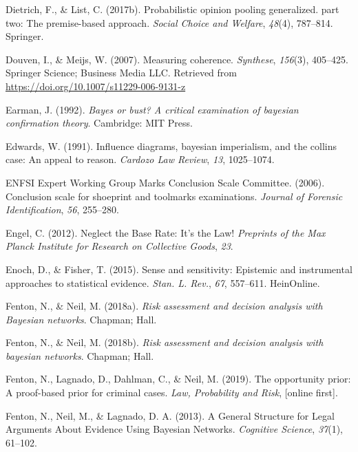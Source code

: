\documentclass[11pt,dvipsnames,enabledeprecatedfontcommands]{scrartcl}
\begin{document}
\hypertarget{ref-dietrich2017probabilistic2}{}
Dietrich, F., \& List, C. (2017b). Probabilistic opinion pooling
generalized. part two: The premise-based approach. \emph{Social Choice
and Welfare}, \emph{48}(4), 787--814. Springer.

\hypertarget{ref-Douven2007measuring}{}
Douven, I., \& Meijs, W. (2007). Measuring coherence. \emph{Synthese},
\emph{156}(3), 405--425. Springer Science; Business Media LLC. Retrieved
from \url{https://doi.org/10.1007/s11229-006-9131-z}

\hypertarget{ref-earman1992bayes}{}
Earman, J. (1992). \emph{Bayes or bust? A critical examination of
bayesian confirmation theory}. Cambridge: MIT Press.

\hypertarget{ref-Edwards1991Influence-diagr}{}
Edwards, W. (1991). Influence diagrams, bayesian imperialism, and the
collins case: An appeal to reason. \emph{Cardozo Law Review}, \emph{13},
1025--1074.

\hypertarget{ref-ENFSI2006entropy}{}
ENFSI Expert Working Group Marks Conclusion Scale Committee. (2006).
Conclusion scale for shoeprint and toolmarks examinations. \emph{Journal
of Forensic Identification}, \emph{56}, 255--280.

\hypertarget{ref-engel2012NeglectBaseRate}{}
Engel, C. (2012). Neglect the Base Rate: It's the Law! \emph{Preprints
of the Max Planck Institute for Research on Collective Goods},
\emph{23}.

\hypertarget{ref-enoch2015sense}{}
Enoch, D., \& Fisher, T. (2015). Sense and sensitivity: Epistemic and
instrumental approaches to statistical evidence. \emph{Stan. L. Rev.},
\emph{67}, 557--611. HeinOnline.

\hypertarget{ref-Fenton2018risk}{}
Fenton, N., \& Neil, M. (2018a). \emph{Risk assessment and decision
analysis with Bayesian networks}. Chapman; Hall.

\hypertarget{ref-Fenton2018Risk}{}
Fenton, N., \& Neil, M. (2018b). \emph{Risk assessment and decision
analysis with bayesian networks}. Chapman; Hall.

\hypertarget{ref-fenton2019OpportunityPriorProofbased}{}
Fenton, N., Lagnado, D., Dahlman, C., \& Neil, M. (2019). The
opportunity prior: A proof-based prior for criminal cases. \emph{Law,
Probability and Risk}, {[}online first{]}.

\hypertarget{ref-fenton2013GeneralStructureLegal}{}
Fenton, N., Neil, M., \& Lagnado, D. A. (2013). A General Structure for
Legal Arguments About Evidence Using Bayesian Networks. \emph{Cognitive
Science}, \emph{37}(1), 61--102.
\end{document}
